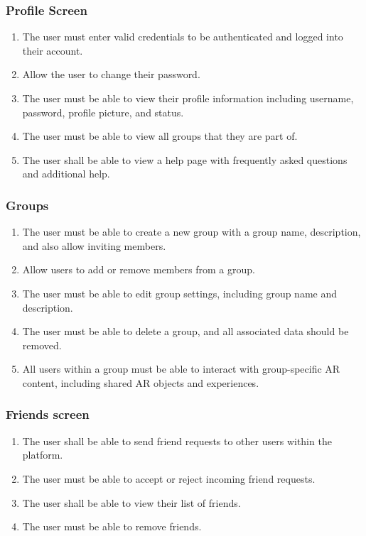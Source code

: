 \documentclass{article}
\begin{document}
\subsubsection{Profile Screen}
\label{ssub:profile_screen}
\begin{enumerate}[align=left, label=\textbf{PS-FR\arabic*:}]
    \item The user must enter valid credentials to be authenticated and logged into their account.
    \item Allow the user to change their password.
    \item The user must be able to view their profile information including username, password, profile picture, and status.
    \item The user must be able to view all groups that they are part of.
    \item The user shall be able to view a help page with frequently asked questions and additional help.
\end{enumerate}

\subsubsection{Groups}
\label{ssub:groups}
\begin{enumerate}[align=left, label=\textbf{G-FR\arabic*:}]
    \item The user must be able to create a new group with a group name, description, and also allow inviting members.
    \item Allow users to add or remove members from a group.
    \item The user must be able to edit group settings, including group name and description.
    \item The user must be able to delete a group, and all associated data should be removed.
    \item All users within a group must be able to interact with group-specific AR content, including shared AR objects and experiences.
\end{enumerate}

\subsubsection{Friends screen}
\label{ssub:friends_screen}
\begin{enumerate}[align=left, label=\textbf{FS-FR\arabic*:}]
    \item The user shall be able to send friend requests to other users within the platform.
    \item The user must be able to accept or reject incoming friend requests.
    \item The user shall be able to view their list of friends.
    \item The user must be able to remove friends.
\end{enumerate}
\end{document}
